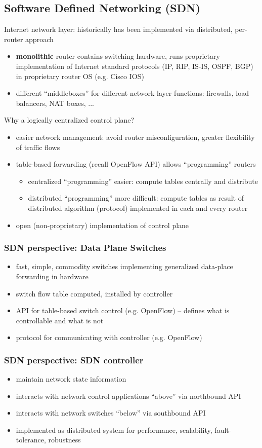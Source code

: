 \subsection{Software Defined Networking (SDN)}
Internet network layer: historically has been implemented via distributed, per-router approach
\begin{itemize}
	\item \textbf{monolithic} router contains switching hardware, runs proprietary implementation of Internet standard protocols (IP, RIP, IS-IS, OSPF, BGP) in proprietary router OS (e.g. Cisco IOS)
	\item different ``middleboxes'' for different network layer functions: firewalls, load balancers, NAT boxes, ...
\end{itemize}
Why a logically centralized control plane?
\begin{itemize}
	\item easier network management: avoid router misconfiguration, greater flexibility of traffic flows
	\item table-based forwarding (recall OpenFlow API) allows ``programming'' routers
	\begin{itemize}
		\item centralized ``programming'' easier: compute tables centrally and distribute
		\item distributed ``programming'' more difficult: compute tables as result of distributed algorithm (protocol) implemented in each and every router
	\end{itemize}
	\item open (non-proprietary) implementation of control plane
\end{itemize}
\subsubsection{SDN perspective: Data Plane Switches}
\begin{itemize}
	\item fast, simple, commodity switches implementing generalized data-place forwarding in hardware
	\item switch flow table computed, installed by controller
	\item API for table-based switch control (e.g. OpenFlow) -- defines what is controllable and what is not
	\item protocol for communicating with controller (e.g. OpenFlow)
\end{itemize}
\subsubsection{SDN perspective: SDN controller}
\begin{itemize}
	\item maintain network state information
	\item interacts with network control applications ``above'' via northbound API
	\item interacts with network switches ``below'' via southbound API
	\item implemented as distributed system for performance, scalability, fault-tolerance, robustness
\end{itemize}
